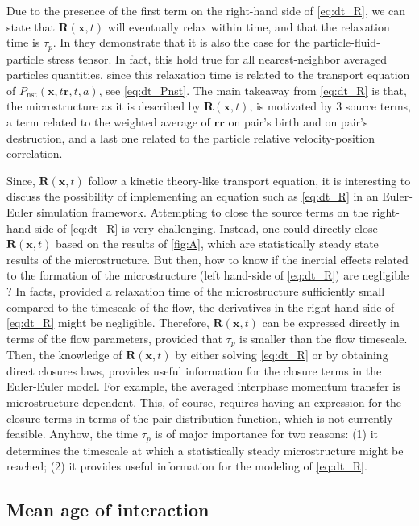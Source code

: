 Due to the presence of the first term on the right-hand side of \ref{eq:dt_R}, we can state that $\textbf{R}(\textbf{x},t)$ will eventually relax within time, and that the relaxation time is $\tau_p$. 
In \citet{zhang2023evolution} they demonstrate that it is also the case for the particle-fluid-particle stress tensor.
In fact, this hold true for all nearest-neighbor averaged particles quantities, since this relaxation time is related to the transport equation of $P_\text{nst}(\textbf{x},t\textbf{r},t,a)$, see \ref{eq:dt_Pnst}.
The main takeaway from \ref{eq:dt_R} is that, the microstructure as it is described by $\textbf{R}(\textbf{x},t)$, is motivated by 3 source terms, a term related to the weighted average of $\textbf{rr}$ on pair's birth and on pair's destruction, and a last one related to the particle relative velocity-position correlation. 


Since, $\textbf{R}(\textbf{x},t)$ follow a kinetic theory-like transport equation, it is interesting to discuss the possibility of implementing an equation such as \ref{eq:dt_R} in an Euler-Euler simulation framework. 
Attempting to close the source terms on the right-hand side of \ref{eq:dt_R} is very challenging. 
Instead, one could directly close $\textbf{R}(\textbf{x},t)$ based on the results of \ref{fig:A}, which are statistically steady state results of the microstructure. 
But then, how to know if the inertial effects related to the formation of the microstructure  (left hand-side of \ref{eq:dt_R}) are negligible ?
In facts, provided a relaxation time of the microstructure sufficiently small compared to the timescale of the flow, the derivatives in the right-hand side of \ref{eq:dt_R} might be negligible.
Therefore, $\textbf{R}(\textbf{x},t)$ can be expressed directly in terms of the flow parameters, provided that $\tau_p$ is smaller than the flow timescale. 
Then, the knowledge of $\textbf{R}(\textbf{x},t)$ by either solving \ref{eq:dt_R} or by obtaining direct closures laws, provides useful information for the closure terms in the Euler-Euler model.
For example, the averaged interphase momentum transfer is microstructure dependent. 
This, of course, requires having an expression for the closure terms in terms of the pair distribution function, which is not currently feasible.
Anyhow, the time $\tau_p$ is of major importance for two reasons: 
(1) it determines the timescale at which a statistically steady microstructure might be reached; 
(2) it provides useful information for the modeling of \ref{eq:dt_R}.

\subsection{Mean age of interaction}

